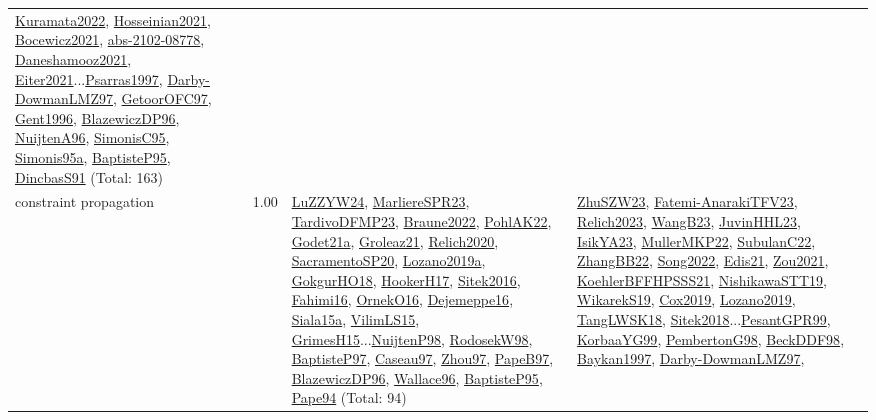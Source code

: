 {\begin{longtable}{p{3cm}r>{\raggedright\arraybackslash}p{6cm}>{\raggedright\arraybackslash}p{6cm}>{\raggedright\arraybackslash}p{8cm}}
\hyperref[detail:Kuramata2022]{Kuramata2022}, \hyperref[detail:Hosseinian2021]{Hosseinian2021}, \hyperref[detail:Bocewicz2021]{Bocewicz2021}, \hyperref[detail:abs-2102-08778]{abs-2102-08778}, \hyperref[detail:Daneshamooz2021]{Daneshamooz2021}, \hyperref[detail:Eiter2021]{Eiter2021}...\hyperref[detail:Psarras1997]{Psarras1997}, \hyperref[detail:Darby-DowmanLMZ97]{Darby-DowmanLMZ97}, \hyperref[detail:GetoorOFC97]{GetoorOFC97}, \hyperref[detail:Gent1996]{Gent1996}, \hyperref[detail:BlazewiczDP96]{BlazewiczDP96}, \hyperref[detail:NuijtenA96]{NuijtenA96}, \hyperref[detail:SimonisC95]{SimonisC95}, \hyperref[detail:Simonis95a]{Simonis95a}, \hyperref[detail:BaptisteP95]{BaptisteP95}, \hyperref[detail:DincbasS91]{DincbasS91} (Total: 163)\\
\index{constraint propagation}\index{CP!constraint propagation}constraint propagation &  1.00 & \hyperref[detail:LuZZYW24]{LuZZYW24}, \hyperref[detail:MarliereSPR23]{MarliereSPR23}, \hyperref[detail:TardivoDFMP23]{TardivoDFMP23}, \hyperref[detail:Braune2022]{Braune2022}, \hyperref[detail:PohlAK22]{PohlAK22}, \hyperref[detail:Godet21a]{Godet21a}, \hyperref[detail:Groleaz21]{Groleaz21}, \hyperref[detail:Relich2020]{Relich2020}, \hyperref[detail:SacramentoSP20]{SacramentoSP20}, \hyperref[detail:Lozano2019a]{Lozano2019a}, \hyperref[detail:GokgurHO18]{GokgurHO18}, \hyperref[detail:HookerH17]{HookerH17}, \hyperref[detail:Sitek2016]{Sitek2016}, \hyperref[detail:Fahimi16]{Fahimi16}, \hyperref[detail:OrnekO16]{OrnekO16}, \hyperref[detail:Dejemeppe16]{Dejemeppe16}, \hyperref[detail:Siala15a]{Siala15a}, \hyperref[detail:VilimLS15]{VilimLS15}, \hyperref[detail:GrimesH15]{GrimesH15}...\hyperref[detail:NuijtenP98]{NuijtenP98}, \hyperref[detail:RodosekW98]{RodosekW98}, \hyperref[detail:BaptisteP97]{BaptisteP97}, \hyperref[detail:Caseau97]{Caseau97}, \hyperref[detail:Zhou97]{Zhou97}, \hyperref[detail:PapeB97]{PapeB97}, \hyperref[detail:BlazewiczDP96]{BlazewiczDP96}, \hyperref[detail:Wallace96]{Wallace96}, \hyperref[detail:BaptisteP95]{BaptisteP95}, \hyperref[detail:Pape94]{Pape94} (Total: 94) & \hyperref[detail:ZhuSZW23]{ZhuSZW23}, \hyperref[detail:Fatemi-AnarakiTFV23]{Fatemi-AnarakiTFV23}, \hyperref[detail:Relich2023]{Relich2023}, \hyperref[detail:WangB23]{WangB23}, \hyperref[detail:JuvinHHL23]{JuvinHHL23}, \hyperref[detail:IsikYA23]{IsikYA23}, \hyperref[detail:MullerMKP22]{MullerMKP22}, \hyperref[detail:SubulanC22]{SubulanC22}, \hyperref[detail:ZhangBB22]{ZhangBB22}, \hyperref[detail:Song2022]{Song2022}, \hyperref[detail:Edis21]{Edis21}, \hyperref[detail:Zou2021]{Zou2021}, \hyperref[detail:KoehlerBFFHPSSS21]{KoehlerBFFHPSSS21}, \hyperref[detail:NishikawaSTT19]{NishikawaSTT19}, \hyperref[detail:WikarekS19]{WikarekS19}, \hyperref[detail:Cox2019]{Cox2019}, \hyperref[detail:Lozano2019]{Lozano2019}, \hyperref[detail:TangLWSK18]{TangLWSK18}, \hyperref[detail:Sitek2018]{Sitek2018}...\hyperref[detail:PesantGPR99]{PesantGPR99}, \hyperref[detail:KorbaaYG99]{KorbaaYG99}, \hyperref[detail:PembertonG98]{PembertonG98}, \hyperref[detail:BeckDDF98]{BeckDDF98}, \hyperref[detail:Baykan1997]{Baykan1997}, \hyperref[detail:Darby-DowmanLMZ97]{Darby-DowmanLMZ97}, 
\end{longtable}}
